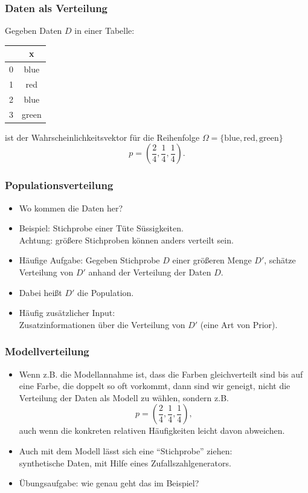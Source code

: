 \begin{frame}
  \frametitle{Daten als Verteilung}
   Gegeben Daten $D$ in einer Tabelle:
   
   \begin{tabular}{|c|c|}
     \hline
       & x \\ \hline
     0 & blue \\
     1 & red \\
     2 & blue \\
     3 & green \\ \hline
   \end{tabular}

   ist der Wahrscheinlichkeitsvektor für die Reihenfolge $\Omega = \{\text{blue}, \text{red}, \text{green}\}$
   \[p = \left(\frac{2}{4}, \frac{1}{4}, \frac{1}{4}\right).\]
 
\end{frame}

\begin{frame}
  \frametitle{Populationsverteilung}
  \begin{itemize}[<+->]
    \item  Wo kommen die Daten her?
 \item  Beispiel: Stichprobe einer Tüte Süssigkeiten. \\
  Achtung: größere Stichproben können anders verteilt sein.
\item Häufige Aufgabe: Gegeben Stichprobe $D$ einer größeren Menge $D'$,
  schätze Verteilung von $D'$ anhand der Verteilung der Daten $D$.
\item  Dabei heißt $D'$ die \alert{Population}.
\item  Häufig zusätzlicher Input: \\
  Zusatzinformationen über die Verteilung von $D'$ (eine Art von \alert{Prior}).
\end{itemize}
\end{frame}

\begin{frame}
  \frametitle{Modellverteilung}
  \begin{itemize}[<+->]
  \item Wenn z.B. die Modellannahme ist, dass die Farben gleichverteilt sind bis auf eine Farbe, die doppelt so oft vorkommt,
    dann sind wir geneigt, nicht die Verteilung der Daten als Modell zu wählen, sondern z.B.
    \[p = \left(\frac{2}{4}, \frac{1}{4}, \frac{1}{4}\right),\]
    auch wenn die konkreten relativen Häufigkeiten leicht davon abweichen.
  \item Auch mit dem Modell lässt sich eine ``Stichprobe'' ziehen: \\
    synthetische Daten, mit Hilfe eines Zufallszahlgenerators.
  \item Übungsaufgabe: wie genau geht das im Beispiel?
\end{itemize}
\end{frame}

